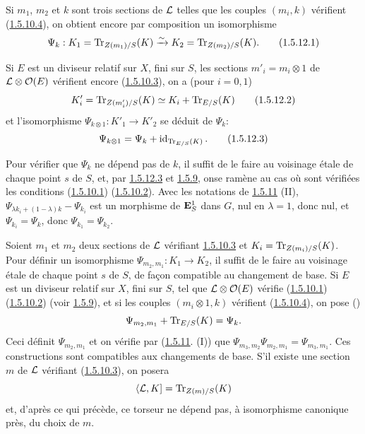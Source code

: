 \documentclass[10pt]{../fichiers-configuration-latex/smfart}
\begin{document}
Si $m_{1}$, $m_{2}$ et $k$ sont trois sections de ${\mathcal L}$ telles
que les couples $(m_{i},k)$ vérifient (\hyperref[XVIII.par1.5.10.4]{1.5.10.4}), on
obtient encore par composition un isomorphisme
\begin{equation*}
\Psi_{k}:K_{1}=\operatorname{Tr}_{Z(m_{1})/S}(K)\xrightarrow{\sim}
K_{2}=\operatorname{Tr}_{Z(m_{2})/S}(K){}.\tag{1.5.12.1}
\end{equation*}

Si $E$ est un diviseur relatif sur $X$, fini sur $S$, les sections
$m'_{i}=m_{i}\otimes 1$ de ${\mathcal L}\otimes {\mathcal O}(E)$ vérifient
encore (\hyperref[XVIII.par1.5.10.3]{1.5.10.3}), on a (pour $i=0,1$)
\begin{equation*}
K'_{i}=\operatorname{Tr}_{Z(m'_{i})/S}(K)\simeq K_{i}+\operatorname{Tr}_{E/S}(K)\tag{1.5.12.2}
\end{equation*}%
et l'isomorphisme $\Psi_{k\otimes 1}:K'_{1}\rightarrow K'_{2}$ se
déduit de $\Psi_{k}$:
\begin{equation*}
\Psi_{k\otimes 1}=\Psi_{k}+\operatorname{id}_{\operatorname{Tr}_{E/S}(K)}{}.\tag{1.5.12.3}
\end{equation*}

Pour vérifier que $\Psi_{k}$ ne dépend pas de $k$, il suffit de le
faire au voisinage étale de chaque point $s$ de $S$, et, par \hyperref[XVIII.eq1.5.12.3]{1.5.12.3}
et \hyperref[XVIII.lem1.5.9]{1.5.9}, on\pageoriginale se ramène au cas où sont
vérifiées les 
conditions (\hyperref[XVIII.par1.5.10.1]{1.5.10.1}) (\hyperref[XVIII.par1.5.10.2]{1.5.10.2}). Avec
les notations de \hyperref[XVIII.lem1.5.11]{1.5.11} (II), 
$\Psi_{\lambda k_{i}+(1-\lambda)k}-\Psi_{k_{i}}$ est un morphisme de
$\mathbf{E}^{1}_{S}$ dans $G$, nul en $\lambda =1$, donc nul, et
$\Psi_{k_{i}}=\Psi_{k}$, donc $\Psi_{k_{1}}=\Psi_{k_{2}}$.

Soient $m_{1}$ et $m_{2}$ deux sections de ${\mathcal L}$ vérifiant
\hyperref[XVIII.par1.5.10.3]{1.5.10.3} et $K_{i}=\operatorname{Tr}_{Z(m_{i})/S}(K)$. Pour définir
un isomorphisme 
$\Psi_{m_{2},m_{1}}:K_{1}\rightarrow K_{2}$, il suffit de le faire au
voisinage étale de chaque point $s$ de $S$, de façon compatible au
changement de base. Si $E$ est un diviseur relatif sur $X$, fini sur
$S$, tel que ${\mathcal L}\otimes {\mathcal O}(E)$ vérifie (\hyperref[XVIII.par1.5.10.1]{1.5.10.1})
(\hyperref[XVIII.par1.5.10.2]{1.5.10.2}) (voir \hyperref[XVIII.lem1.5.9]{1.5.9}), et si les
couples $(m_{i}\otimes 1,k)$ 
vérifient (\hyperref[XVIII.par1.5.10.4]{1.5.10.4}), on pose (\cf {})
$$
\Psi_{m_{2},m_{1}}+\operatorname{Tr}_{E/S}(K)=\Psi_{k}{}.
$$
Ceci définit $\Psi_{m_{2},m_{1}}$ et on vérifie par
(\hyperref[XVIII.lem1.5.11]{1.5.11}. (I)) que $\Psi_{m_{3},
  m_{2}}\Psi_{m_{2},m_{1}}=\Psi_{m_{3},m_{1}}$. Ces 
constructions sont compatibles aux changements de base. S'il existe
une section $m$ de ${\mathcal L}$ vérifiant (\hyperref[XVIII.par1.5.10.3]{1.5.10.3}), on posera
$$
\langle {\mathcal L},K]=\operatorname{Tr}_{Z(m)/S}(K)
$$
et, d'après ce qui précède, ce torseur ne dépend pas, à isomorphisme
canonique près, du choix de $m$.
\end{document}
